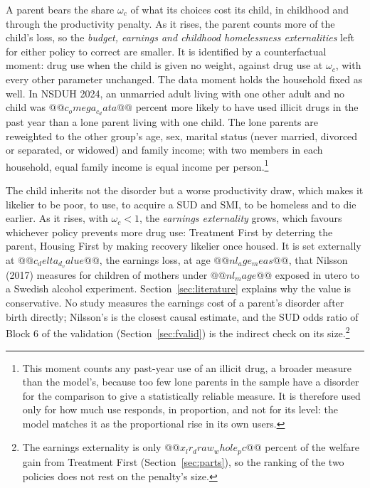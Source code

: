 \documentclass[10pt]{article}
\begin{document}
\begin{description}\setlength{\itemsep}{0.25em}\setlength{\parskip}{0em}
\item[$\omega_c$, the parent's weight on its child.] A parent bears the share $\omega_c$ of what its choices cost its child, in childhood and through the productivity penalty. As it rises, the parent counts more of the child's loss, so the \emph{budget, earnings and childhood homelessness externalities} left for either policy to correct are smaller. It is identified by a counterfactual moment: drug use when the child is given no weight, against drug use at $\omega_c$, with every other parameter unchanged.  The data moment holds the household fixed as well. In NSDUH 2024, an unmarried adult living with one other adult and no child was $@@c_omega_c_data@@$ percent more likely to have used illicit drugs in the past year than a lone parent living with one child. The lone parents are reweighted to the other group's age, sex, marital status (never married, divorced or separated, or widowed) and family income; with two members in each household, equal family income is equal income per person.\footnote{This moment counts any past-year use of an illicit drug, a broader measure than the model's, because too few lone parents in the sample have a disorder for the comparison to give a statistically reliable measure. It is therefore used only for how much use responds, in proportion, and not for its level: the model matches it as the proportional rise in its own users.}
\item[$\delta_d$, earnings the child loses because of a parent's SUD.] The child inherits not the disorder but a worse productivity draw, which makes it likelier to be poor, to use, to acquire a SUD and SMI, to be homeless and to die earlier. As it rises, with $\omega_c<1$, the \emph{earnings externality} grows, which favours whichever policy prevents more drug use: Treatment First by deterring the parent, Housing First by making recovery likelier once housed. It is set externally at $@@c_delta_d_value@@$, the earnings loss, at age $@@nl_age_meas@@$, that Nilsson (2017) measures for children of mothers under $@@nl_mage@@$ exposed in utero to a Swedish alcohol experiment. Section~\ref{sec:literature} explains why the value is conservative. No study measures the earnings cost of a parent's disorder after birth directly; Nilsson's is the closest causal estimate, and the SUD odds ratio of Block 6 of the validation (Section~\ref{sec:fvalid}) is the indirect check on its size.\footnote{The earnings externality is only $@@x_lr_draw_whole_pc@@$ percent of the welfare gain from Treatment First (Section~\ref{sec:parts}), so the ranking of the two policies does not rest on the penalty's size.}
\end{description}
\end{document}
